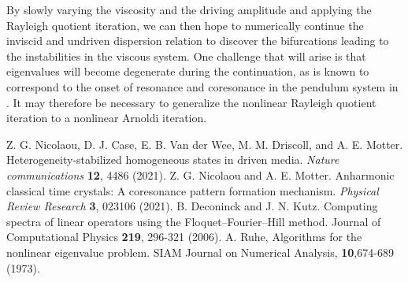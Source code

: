 \documentclass[aps,pre,amsmath,amssymb,floatfix,onecolumn,notitlepage,10pt]{revtex4-1}
\begin{document}
By slowly varying the viscosity and the driving amplitude and applying the Rayleigh quotient iteration, we can then hope to numerically continue the inviscid and undriven dispersion relation to discover the bifurcations leading to the instabilities in the viscous system. One challenge that will arise is that eigenvalues will become degenerate during the continuation, as is known to correspond to the onset of resonance and coresonance in the pendulum system in \cite{2021_Nicolaou_2}. It may therefore be necessary to generalize the nonlinear Rayleigh quotient iteration to a nonlinear Arnoldi iteration. 

\begin{thebibliography}{99}
 Z. G. Nicolaou, D. J. Case, E. B. Van der Wee, M. M. Driscoll, and A. E. Motter. Heterogeneity-stabilized homogeneous states in driven media. \textit{Nature communications} \textbf{12}, 4486 (2021).
 Z. G. Nicolaou and A. E. Motter. Anharmonic classical time crystals: A coresonance pattern formation mechanism. \textit{Physical Review Research} \textbf{3}, 023106 (2021).
B. Deconinck and J. N. Kutz. Computing spectra of linear operators using the Floquet–Fourier–Hill method. Journal of Computational Physics \textbf{219}, 296-321 (2006).
 A. Ruhe, Algorithms for the nonlinear eigenvalue problem. SIAM Journal on Numerical Analysis, \textbf{10},674-689 (1973).
\end{thebibliography}
\end{document}
